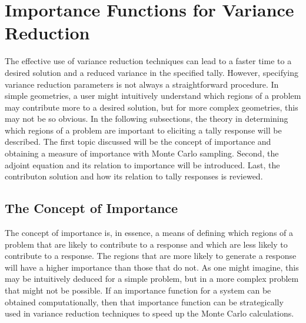 \section{Importance Functions for Variance Reduction}
\label{sec:Importance}

The effective use of variance reduction techniques can lead to a faster time to
a desired solution and a reduced variance in the specified tally. However,
specifying variance reduction parameters is not always a straightforward
procedure. In simple geometries, a user might intuitively understand which
regions of a problem may contribute more to a desired solution, but for more
complex geometries, this may not be so obvious.
In the following subsections, the theory in determining which regions of a
problem are important to eliciting a tally response will be described.
The first topic discussed will be
the concept of importance and obtaining a measure of importance with
Monte Carlo sampling.
Second, the adjoint equation and its relation to importance will be introduced.
Last, the contributon solution and how its relation to tally responses is
reviewed.

\subsection{The Concept of Importance}
\label{sec:Importance}

The concept of importance is, in essence, a means of defining which regions of
a problem that are likely to contribute to a
response and which are less likely to contribute to a response. The regions
that are more likely to generate a response will have a
higher importance than those that do not. As one might imagine, this may be
intuitively deduced for a simple problem, but in a more complex problem
that might not be possible.
If an importance
function for a system can be obtained computationally, then that importance
function can be
strategically used in variance reduction techniques to speed up the Monte Carlo
calculations.

